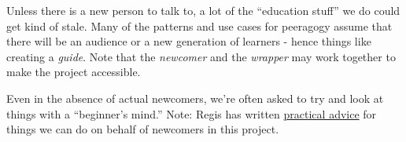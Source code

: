 Unless there is a new person to talk to, a lot of the ``education
stuff'' we do could get kind of stale. Many of the patterns and use
cases for peeragogy assume that there will be an audience or a new
generation of learners - hence things like creating a \emph{guide}. Note
that the \emph{newcomer} and the \emph{wrapper} may work together to
make the project accessible.

Even in the absence of actual newcomers, we're often asked to try and
look at things with a ``beginner's mind.'' Note: Regis has written
\href{http://socialmediaclassroom.com/host/peeragogy/forum/suggest-new-discussion-topics\#comment-1796}{practical
advice} for things we can do on behalf of newcomers in this project.
